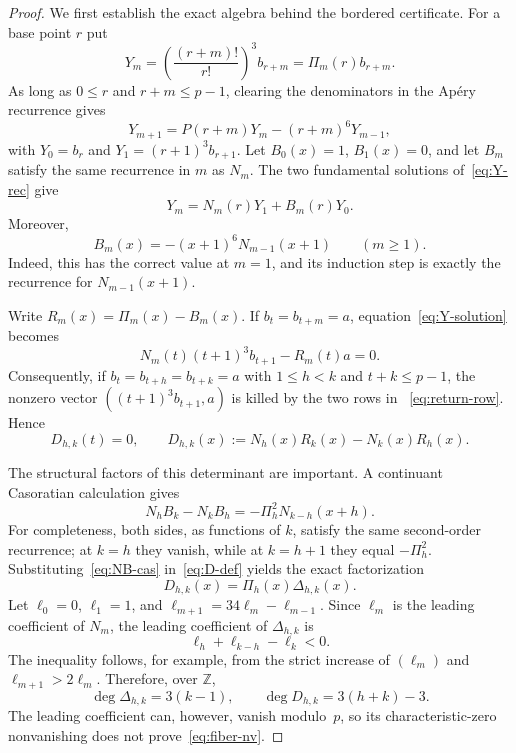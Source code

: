 \begin{proof}
We first establish the exact algebra behind the bordered certificate.
For a base point $r$ put
\[
 Y_m=\left(\frac{(r+m)!}{r!}\right)^3b_{r+m}
     =\Pi_m(r)b_{r+m}.
\]
As long as $0\leq r$ and $r+m\leq p-1$, clearing the denominators in the
Ap\'ery recurrence gives
\begin{equation}
 Y_{m+1}=P(r+m)Y_m-(r+m)^6Y_{m-1},             \label{eq:Y-rec}
\end{equation}
with $Y_0=b_r$ and $Y_1=(r+1)^3b_{r+1}$.
Let $B_0(x)=1$, $B_1(x)=0$, and let $B_m$ satisfy the same recurrence in
$m$ as $N_m$.  The two fundamental solutions of~\eqref{eq:Y-rec} give
\begin{equation}
 Y_m=N_m(r)Y_1+B_m(r)Y_0.                      \label{eq:Y-solution}
\end{equation}
Moreover,
\begin{equation}
 B_m(x)=-(x+1)^6N_{m-1}(x+1)\qquad(m\geq1).   \label{eq:B-closed}
\end{equation}
Indeed, this has the correct value at $m=1$, and its induction step is
exactly the recurrence for $N_{m-1}(x+1)$.

Write $R_m(x)=\Pi_m(x)-B_m(x)$.  If
$b_t=b_{t+m}=a$, equation~\eqref{eq:Y-solution} becomes
\begin{equation}
 N_m(t)(t+1)^3b_{t+1}-R_m(t)a=0.              \label{eq:return-row}
\end{equation}
Consequently, if $b_t=b_{t+h}=b_{t+k}=a$ with
$1\leq h<k$ and $t+k\leq p-1$, the nonzero vector
$((t+1)^3b_{t+1},a)$ is killed by the two rows in
~\eqref{eq:return-row}.  Hence
\begin{equation}
 D_{h,k}(t)=0,
 \qquad
 D_{h,k}(x):=N_h(x)R_k(x)-N_k(x)R_h(x).       \label{eq:D-def}
\end{equation}

The structural factors of this determinant are important.  A continuant
Casoratian calculation gives
\begin{equation}
 N_hB_k-N_kB_h=-\Pi_h^2N_{k-h}(x+h).          \label{eq:NB-cas}
\end{equation}
For completeness, both sides, as functions of $k$, satisfy the same
second-order recurrence; at $k=h$ they vanish, while at $k=h+1$ they
equal $-\Pi_h^2$.  Substituting~\eqref{eq:NB-cas} in~\eqref{eq:D-def}
yields the exact factorization
\begin{equation}
 \boxed{D_{h,k}(x)=\Pi_h(x)\Delta_{h,k}(x).}  \label{eq:D-factor}
\end{equation}
Let $\ell_0=0$, $\ell_1=1$, and
$\ell_{m+1}=34\ell_m-\ell_{m-1}$.  Since $\ell_m$ is the leading
coefficient of $N_m$, the leading coefficient of $\Delta_{h,k}$ is
\[
 \ell_h+\ell_{k-h}-\ell_k<0.
\]
The inequality follows, for example, from the strict increase of
$(\ell_m)$ and $\ell_{m+1}>2\ell_m$.  Therefore, over $\mathbb Z$,
\begin{equation}
 \deg\Delta_{h,k}=3(k-1),\qquad
 \deg D_{h,k}=3(h+k)-3.                       \label{eq:D-degrees}
\end{equation}
The leading coefficient can, however, vanish modulo~$p$, so its
characteristic-zero nonvanishing does not prove~\eqref{eq:fiber-nv}.


\end{proof}
